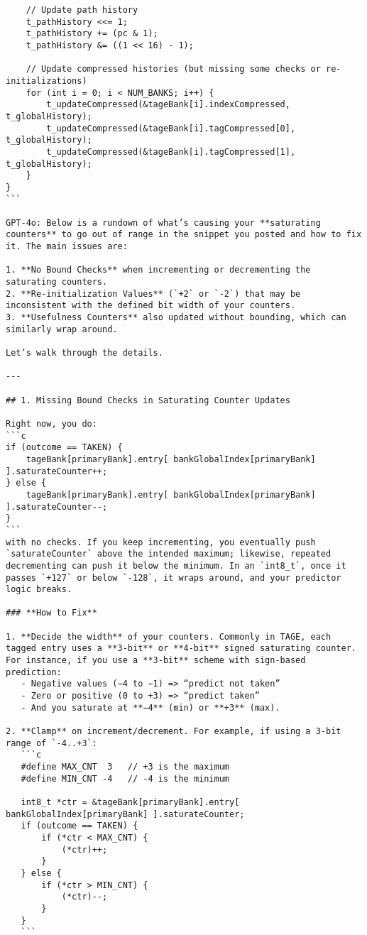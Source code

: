 \documentclass[11pt]{article}
\begin{document}
\begin{verbatim}
    // Update path history
    t_pathHistory <<= 1;
    t_pathHistory += (pc & 1);
    t_pathHistory &= ((1 << 16) - 1);

    // Update compressed histories (but missing some checks or re-initializations)
    for (int i = 0; i < NUM_BANKS; i++) {
        t_updateCompressed(&tageBank[i].indexCompressed, t_globalHistory);
        t_updateCompressed(&tageBank[i].tagCompressed[0], t_globalHistory);
        t_updateCompressed(&tageBank[i].tagCompressed[1], t_globalHistory);
    }
}
```

GPT-4o: Below is a rundown of what’s causing your **saturating counters** to go out of range in the snippet you posted and how to fix it. The main issues are:

1. **No Bound Checks** when incrementing or decrementing the saturating counters.
2. **Re-initialization Values** (`+2` or `-2`) that may be inconsistent with the defined bit width of your counters.
3. **Usefulness Counters** also updated without bounding, which can similarly wrap around.

Let’s walk through the details.

---

## 1. Missing Bound Checks in Saturating Counter Updates

Right now, you do:
```c
if (outcome == TAKEN) {
    tageBank[primaryBank].entry[ bankGlobalIndex[primaryBank] ].saturateCounter++;
} else {
    tageBank[primaryBank].entry[ bankGlobalIndex[primaryBank] ].saturateCounter--;
}
```
with no checks. If you keep incrementing, you eventually push `saturateCounter` above the intended maximum; likewise, repeated decrementing can push it below the minimum. In an `int8_t`, once it passes `+127` or below `-128`, it wraps around, and your predictor logic breaks.

### **How to Fix**

1. **Decide the width** of your counters. Commonly in TAGE, each tagged entry uses a **3-bit** or **4-bit** signed saturating counter. For instance, if you use a **3-bit** scheme with sign-based prediction:
   - Negative values (−4 to −1) => “predict not taken”
   - Zero or positive (0 to +3) => “predict taken”
   - And you saturate at **−4** (min) or **+3** (max).

2. **Clamp** on increment/decrement. For example, if using a 3-bit range of `-4..+3`:
   ```c
   #define MAX_CNT  3   // +3 is the maximum
   #define MIN_CNT -4   // -4 is the minimum

   int8_t *ctr = &tageBank[primaryBank].entry[ bankGlobalIndex[primaryBank] ].saturateCounter;
   if (outcome == TAKEN) {
       if (*ctr < MAX_CNT) {
           (*ctr)++;
       }
   } else {
       if (*ctr > MIN_CNT) {
           (*ctr)--;
       }
   }
   ```


\end{verbatim}
\end{document}
